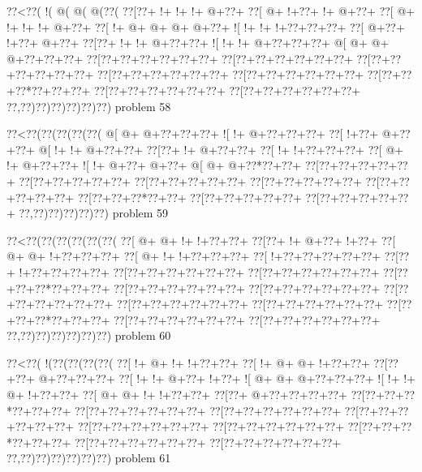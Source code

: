 \vbox{\vbox{\goo
\0??<\0??(\- !(\- @(\- @(\- @(\0??(
\0??[\0??+\- !+\- !+\- !+\- @+\0??+
\0??[\- @+\- !+\0??+\- !+\- @+\0??+
\0??[\- @+\- !+\- !+\- !+\- @+\0??+
\0??[\- !+\- @+\- @+\- @+\- @+\0??+
\- ![\- !+\- !+\- !+\0??+\0??+\0??+
\0??[\- @+\0??+\- !+\0??+\- @+\0??+
\0??[\0??+\- !+\- !+\- @+\0??+\0??+
\- ![\- !+\- !+\- @+\0??+\0??+\0??+
\- @[\- @+\- @+\- @+\0??+\0??+\0??+
\0??[\0??+\0??+\0??+\0??+\0??+\0??+
\0??[\0??+\0??+\0??+\0??+\0??+\0??+
\0??[\0??+\0??+\0??+\0??+\0??+\0??+
\0??[\0??+\0??+\0??+\0??+\0??+\0??+
\0??[\0??+\0??+\0??+\0??+\0??+\0??+
\0??[\0??+\0??+\0??*\0??+\0??+\0??+
\0??[\0??+\0??+\0??+\0??+\0??+\0??+
\0??[\0??+\0??+\0??+\0??+\0??+\0??+
\0??,\0??)\0??)\0??)\0??)\0??)\0??)
}
\hfil problem 58\hfil\break
}

\vbox{\vbox{\goo
\0??<\0??(\0??(\0??(\0??(\0??(
\- @[\- @+\- @+\0??+\0??+\0??+
\- ![\- !+\- @+\0??+\0??+\0??+
\0??[\- !+\0??+\- @+\0??+\0??+
\- @[\- !+\- !+\- @+\0??+\0??+
\0??[\0??+\- !+\- @+\0??+\0??+
\0??[\- !+\- !+\0??+\0??+\0??+
\0??[\- @+\- !+\- @+\0??+\0??+
\- ![\- !+\- @+\0??+\- @+\0??+
\- @[\- @+\- @+\0??*\0??+\0??+
\0??[\0??+\0??+\0??+\0??+\0??+
\0??[\0??+\0??+\0??+\0??+\0??+
\0??[\0??+\0??+\0??+\0??+\0??+
\0??[\0??+\0??+\0??+\0??+\0??+
\0??[\0??+\0??+\0??+\0??+\0??+
\0??[\0??+\0??+\0??*\0??+\0??+
\0??[\0??+\0??+\0??+\0??+\0??+
\0??[\0??+\0??+\0??+\0??+\0??+
\0??,\0??)\0??)\0??)\0??)\0??)
}
\hfil problem 59\hfil\break
}

\vbox{\vbox{\goo
\0??<\0??(\0??(\0??(\0??(\0??(\0??(
\0??[\- @+\- @+\- !+\- !+\0??+\0??+
\0??[\0??+\- !+\- @+\0??+\- !+\0??+
\0??[\- @+\- @+\- !+\0??+\0??+\0??+
\0??[\- @+\- !+\- !+\0??+\0??+\0??+
\0??[\- !+\0??+\0??+\0??+\0??+\0??+
\0??[\0??+\- !+\0??+\0??+\0??+\0??+
\0??[\0??+\0??+\0??+\0??+\0??+\0??+
\0??[\0??+\0??+\0??+\0??+\0??+\0??+
\0??[\0??+\0??+\0??*\0??+\0??+\0??+
\0??[\0??+\0??+\0??+\0??+\0??+\0??+
\0??[\0??+\0??+\0??+\0??+\0??+\0??+
\0??[\0??+\0??+\0??+\0??+\0??+\0??+
\0??[\0??+\0??+\0??+\0??+\0??+\0??+
\0??[\0??+\0??+\0??+\0??+\0??+\0??+
\0??[\0??+\0??+\0??*\0??+\0??+\0??+
\0??[\0??+\0??+\0??+\0??+\0??+\0??+
\0??[\0??+\0??+\0??+\0??+\0??+\0??+
\0??,\0??)\0??)\0??)\0??)\0??)\0??)
}
\hfil problem 60\hfil\break
}

\vbox{\vbox{\goo
\0??<\0??(\- !(\0??(\0??(\0??(\0??(
\0??[\- !+\- @+\- !+\- !+\0??+\0??+
\0??[\- !+\- @+\- @+\- !+\0??+\0??+
\0??[\0??+\0??+\- @+\0??+\0??+\0??+
\0??[\- !+\- !+\- @+\0??+\- !+\0??+
\- ![\- @+\- @+\- @+\0??+\0??+\0??+
\- ![\- !+\- !+\- @+\- !+\0??+\0??+
\0??[\- @+\- @+\- !+\- !+\0??+\0??+
\0??[\0??+\- @+\0??+\0??+\0??+\0??+
\0??[\0??+\0??+\0??*\0??+\0??+\0??+
\0??[\0??+\0??+\0??+\0??+\0??+\0??+
\0??[\0??+\0??+\0??+\0??+\0??+\0??+
\0??[\0??+\0??+\0??+\0??+\0??+\0??+
\0??[\0??+\0??+\0??+\0??+\0??+\0??+
\0??[\0??+\0??+\0??+\0??+\0??+\0??+
\0??[\0??+\0??+\0??*\0??+\0??+\0??+
\0??[\0??+\0??+\0??+\0??+\0??+\0??+
\0??[\0??+\0??+\0??+\0??+\0??+\0??+
\0??,\0??)\0??)\0??)\0??)\0??)\0??)
}
\hfil problem 61\hfil\break
}

